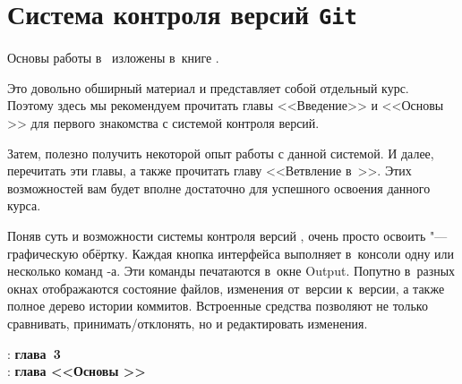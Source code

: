 \section{Система контроля версий \texttt{Git}}
Основы работы в~\git{} изложены в~книге \cite{Chacon:2023:ru}.

Это довольно обширный материал и представляет собой отдельный курс. Поэтому здесь мы рекомендуем прочитать главы <<Введение>> и <<Основы \git{}>> для первого знакомства с системой контроля версий.

Затем, полезно получить некоторой опыт работы с данной системой. И далее, перечитать эти главы, а также прочитать главу <<Ветвление в~\git{}>>. Этих возможностей вам будет вполне достаточно для успешного освоения данного курса.

Поняв суть и возможности системы контроля версий \git{}, очень просто освоить  "--- графическую обёртку. Каждая кнопка интерфейса выполняет в~консоли одну или несколько команд \git{}-а. Эти команды печатаются в~окне \textenglish{Output}. Попутно в~разных окнах отображаются состояние файлов, изменения от~версии к~версии, а также полное дерево истории коммитов. Встроенные средства позволяют не только сравнивать, принимать/отклонять, но и редактировать изменения.



\WhatToReadSection
\textcite{Stroustrup:2016:ru}: \textbf{глава~3} \\\indent
\textcite{Chacon:2023:ru}: \textbf{глава <<Основы \git{}>>}



